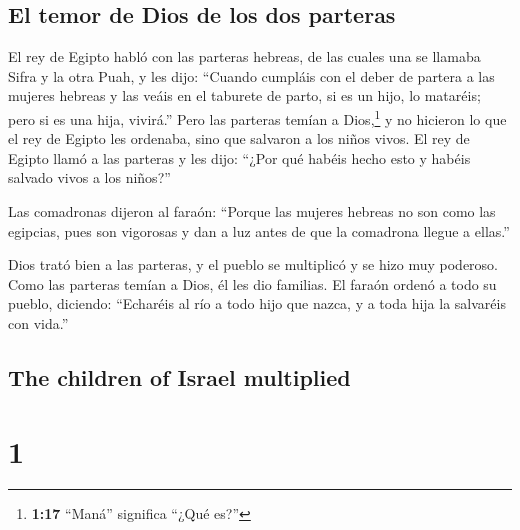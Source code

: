 \begin{paracol}{2}
\hypertarget{el-temor-de-dios-de-los-dos-parteras}{%
\subsection{El temor de Dios de los dos
parteras}\label{el-temor-de-dios-de-los-dos-parteras}}

 El rey de Egipto habló con las parteras hebreas, de las
cuales una se llamaba Sifra y la otra Puah,  y les dijo:
``Cuando cumpláis con el deber de partera a las mujeres hebreas y las
veáis en el taburete de parto, si es un hijo, lo mataréis; pero si es
una hija, vivirá.''  Pero las parteras temían a
Dios,\footnote{\textbf{1:17} ``Maná'' significa ``¿Qué es?''} y no
hicieron lo que el rey de Egipto les ordenaba, sino que salvaron a los
niños vivos.  El rey de Egipto llamó a las parteras y les
dijo: ``¿Por qué habéis hecho esto y habéis salvado vivos a los niños?''

 Las comadronas dijeron al faraón: ``Porque las mujeres
hebreas no son como las egipcias, pues son vigorosas y dan a luz antes
de que la comadrona llegue a ellas.''

 Dios trató bien a las parteras, y el pueblo se
multiplicó y se hizo muy poderoso.  Como las parteras
temían a Dios, él les dio familias.  El faraón ordenó a
todo su pueblo, diciendo: ``Echaréis al río a todo hijo que nazca, y a
toda hija la salvaréis con vida.''

\switchcolumn
\begin{otherlanguage}{english}

\hypertarget{the-children-of-israel-multiplied}{%
\subsection{The children of Israel
multiplied}\label{the-children-of-israel-multiplied}}

\hypertarget{section-1}{%
\section{1}\label{section-1}}


\end{otherlanguage}
\end{paracol}

